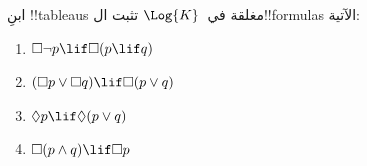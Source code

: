 \documentclass[../../../include/open-logic-section]{subfiles}
\begin{document}
\begin{prob}
  ابنِ !!{tableau}s مغلقة في~$\Log{K}$ تثبت ال!!{formula}s الآتية:
  \begin{enumerate}
    \item $\Box \lnot p \lif \Box(p \lif q)$
    \item $(\Box p \lor \Box q) \lif \Box(p \lor q)$
    \item $\Diamond p \lif \Diamond(p \lor q)$
    \item $\Box(p \land q) \lif \Box p$
  \end{enumerate}
\end{prob}
\end{document}
